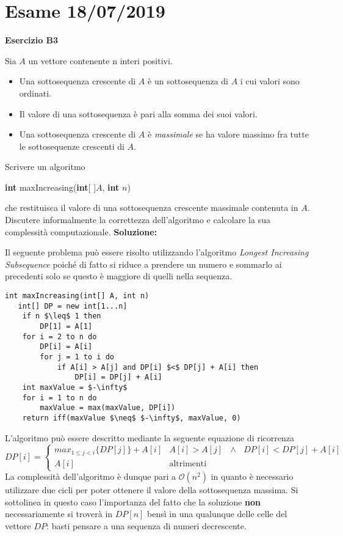 \documentclass[../cheatSheetAlgoritmi.tex]{subfiles}
\begin{document}
\section{Esame 18/07/2019}
\textbf{Esercizio B3}

Sia $A$ un vettore contenente n interi positivi.
\begin{itemize}
	\item Una sottosequenza crescente di $A$ è un sottosequenza di $A$ i cui valori sono ordinati.
	\item Il valore di una sottosequenza è pari alla somma dei suoi valori.
	\item Una sottosequenza crescente di $A$ è \emph{massimale} se ha valore massimo fra tutte le sottosequenze crescenti di $A$.
\end{itemize}
Scrivere un algoritmo 
\begin{center}
	\textbf{int} maxIncreasing(\textbf{int}[ ]$A$, \textbf{int} $n$)
\end{center}
che  restituisca  il valore di  una  sottosequenza  crescente massimale contenuta in $A$. Discutere  informalmente  la  correttezza  dell'algoritmo  e calcolare la sua complessità computazionale.
\textbf{Soluzione:}

Il seguente problema può essere risolto utilizzando l'algoritmo \emph{Longest Increasing Subsequence} poiché di fatto si riduce a prendere un numero e sommarlo ai precedenti solo se questo è maggiore di quelli nella sequenza.
\begin{lstlisting}[caption=Longest Increasing Subsequence]
int maxIncreasing(int[] A, int n)
   int[] DP = new int[1...n]
   	if n $\leq$ 1 then
   		DP[1] = A[1]
	for i = 2 to n do
		DP[i] = A[i]
		for j = 1 to i do
			if A[i] > A[j] and DP[i] $<$ DP[j] + A[i] then
				DP[i] = DP[j] + A[i]
	int maxValue = $-\infty$
	for i = 1 to n do
		maxValue = max(maxValue, DP[i])
	return iff(maxValue $\neq$ $-\infty$, maxValue, 0)
\end{lstlisting}
L'algoritmo può essere descritto mediante la seguente equazione di ricorrenza
\begin{equation*}
  	DP[i]=\begin{cases}
    	max_{1 \leq j < i}\{DP[j]\} + A[i] & \text{$A[i] > A[j]$ $\land$ $DP[i] < DP[j] + A[i]  $}\\
    	A[i] & \text{altrimenti}
  	\end{cases}
\end{equation*}
La complessità dell'algoritmo è dunque pari a $\mathcal{O}(n^{2})$ in quanto è necessario utilizzare due cicli per poter ottenere il valore della sottosequenza massima. Si sottolinea in questo caso l'importanza del fatto che la soluzione \textbf{non} necessariamente si troverà in $DP[n]$ bensì in una qualunque delle celle del vettore $DP$: basti pensare a una sequenza di numeri decrescente.
\end{document}
